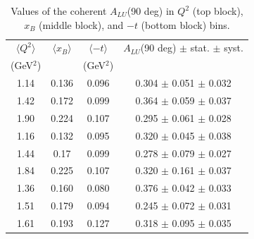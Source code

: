 \documentclass[aps,prc,preprint,superscriptaddress]{revtex4}
\begin{document}
\begin{table}[!h]
   \begin{center}
      \begin{tabular}{|c|c|c|c|}
         \hline
 $\langle Q^{2} \rangle$ & $\langle x_{B} \rangle$ & $\langle -t \rangle$  & $A_{LU}$(90 deg) $\pm$ stat. $\pm$ syst.\\
 (GeV$^{2}$) &           & (GeV$^{2}$) &  \\
  \hline
  1.14  & 0.136 & 0.096 &  0.304  $\pm$ 0.051  $\pm$ 0.032 \\
  1.42  & 0.172 & 0.099 &  0.364  $\pm$ 0.059  $\pm$ 0.037 \\
  1.90  & 0.224 & 0.107 &  0.295  $\pm$ 0.061  $\pm$ 0.028 \\
  \hline 
  1.16  & 0.132 & 0.095 &  0.320  $\pm$ 0.045  $\pm$ 0.038 \\
  1.44  & 0.17  & 0.099 &  0.278  $\pm$ 0.079  $\pm$ 0.027 \\
  1.84  & 0.225 & 0.107 &  0.320  $\pm$ 0.161  $\pm$ 0.037 \\
  \hline 
  1.36  & 0.160 & 0.080 &  0.376  $\pm$ 0.042  $\pm$ 0.033 \\
  1.51  & 0.179 & 0.094 &  0.245  $\pm$ 0.072  $\pm$ 0.031 \\
  1.61  & 0.193 & 0.127 &  0.318  $\pm$ 0.095  $\pm$ 0.035 \\
  \hline
  \end{tabular}
  \caption{Values of the coherent $A_{LU}$(90 deg) in $Q^2$ (top block), $x_B$ (middle block), and $-t$ (bottom block) bins. }
  \label{table:Coh_BSA_90}
  \end{center}
\end{table}

\end{document}
